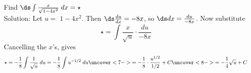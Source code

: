 \begin{frame}
\begin{example}
Find $ \ds \int \frac{x}{\sqrt{1-4x^2}}\; dx =\star $\\
Solution:  
Let $ u= $ \pause $ 1-4x^2 $. \pause Then  $ \ds \frac{du}{dx}=-8x $, so \pause
$ \ds  dx=\frac{du}{-8x} $.  Now substitute\pause
\[  \star = \int \frac {x}{\sqrt{u}}\cdot \frac{du}{-8x} \] \pause
Cancelling the $ x $'s, gives 
\[\star  = -\frac18\int\frac{1}{\sqrt{u}}\;du = -\frac18 \int u^{-1/2}\; du   
 \uncover<7->{
  = -\frac18\cdot \frac{ u^{1/2}}{1/2}+C}\uncover<8->{ = -\frac14\sqrt{u}+C} 
\]   
\end{example}
\end{frame}

